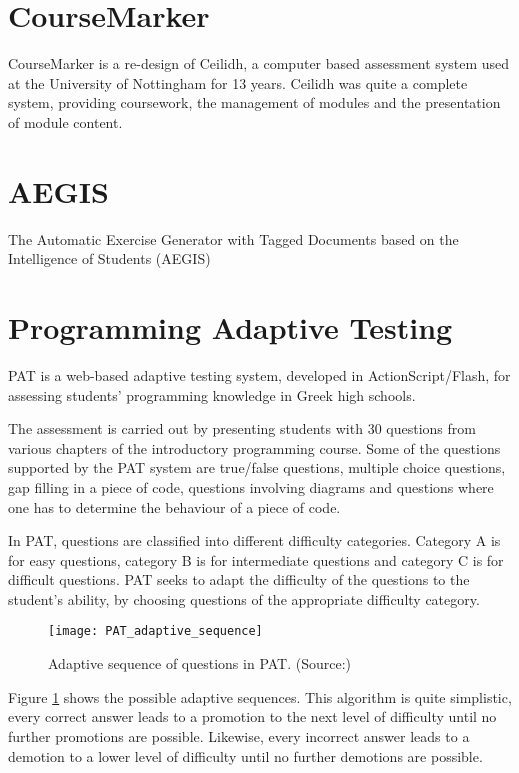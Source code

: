\section{CourseMarker}
CourseMarker is a re-design of Ceilidh, a computer based assessment system used at the University of Nottingham for 13 years. Ceilidh was quite a complete system, providing coursework, the management of modules and the presentation of module content.

\section{AEGIS}
The Automatic Exercise Generator with Tagged Documents based on the Intelligence of Students (AEGIS)

\section{Programming Adaptive Testing}
PAT\cite{PAT} is a web-based adaptive testing system, developed in ActionScript/Flash, for assessing students' programming knowledge in Greek high schools. \newline

The assessment is carried out by presenting students with 30 questions from various chapters of the introductory programming course. Some of the questions supported by the PAT system are true/false questions, multiple choice questions, gap filling in a piece of code, questions involving diagrams and questions where one has to determine the behaviour of a piece of code.\newline

In PAT, questions are classified into different difficulty categories. Category A is for easy questions, category B is for intermediate questions and category C is for difficult questions. PAT seeks to adapt the difficulty of the questions to the student's ability, by choosing questions of the appropriate difficulty category.

\begin{figure}[H]
\centering
\texttt{[image: PAT\_adaptive\_sequence]}
\caption{Adaptive sequence of questions in PAT. (Source:\cite{PAT})}
\label{fig:PAT_adaptive_sequence}
\end{figure}

Figure \ref{fig:PAT_adaptive_sequence} shows the possible adaptive sequences. This algorithm is quite simplistic, every correct answer leads to a promotion to the next level of difficulty until no further promotions are possible. Likewise, every incorrect answer leads to a demotion to a lower level of difficulty until no further demotions are possible.\newline

